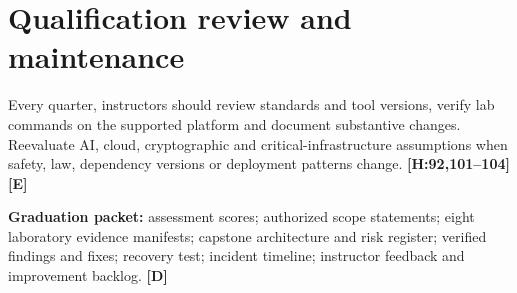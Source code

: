 \documentclass[10pt,letterpaper,oneside]{article}
\newcommand{\handbookref}[1]{\textsf{\color{accent}\textbf{[H:#1]}}}
\newcommand{\modernext}{\textsf{\color{muted}\textbf{[E]}}}
\newcommand{\designed}{\textsf{\color{accent}\textbf{[D]}}}
\begin{document}
\section{Qualification review and maintenance}
Every quarter, instructors should review standards and tool versions, verify lab commands on the supported platform and document substantive changes. Reevaluate AI, cloud, cryptographic and critical-infrastructure assumptions when safety, law, dependency versions or deployment patterns change. \handbookref{92,101--104} \modernext{}
\begin{warningbox}\textbf{Graduation packet:} assessment scores; authorized scope statements; eight laboratory evidence manifests; capstone architecture and risk register; verified findings and fixes; recovery test; incident timeline; instructor feedback and improvement backlog. \designed{}\end{warningbox}
\end{document}
